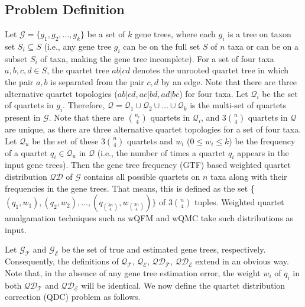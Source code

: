 \documentclass[10pt,a4paper]{article}
\begin{document}
\subsection{Problem Definition}
Let $\mathcal{G} =  \{g_1, g_2, \ldots, g_k\}$ be a set of $k$ gene trees, where each $g_i$ is a tree on taxon set $S_i \subseteq S$ (i.e., any gene tree $g_i$ can be on the full set $S$ of $n$ taxa or can be on a subset $S_i$ of taxa, making the gene tree incomplete). For a set of four taxa $a,b,c,d \in S$, the quartet tree $ab|cd$ denotes the unrooted quartet tree in which the pair $a, b$ is separated from the pair $c, d$ by an edge. Note that there are three alternative quartet topologies ($ab|cd, ac|bd, ad|bc$) for four taxa.
Let $\mathcal{Q}_i$ be the set of quartets in $g_i$. Therefore, $\mathcal{Q} = \mathcal{Q}_1 \cup \mathcal{Q}_2 \cup \ldots \cup \mathcal{Q}_k$ is the multi-set of quartets present in $\mathcal{G}$. Note that there are $n_i \choose 4$ quartets in $\mathcal{Q}_i$, and $3$$n \choose 4$ quartets in $\mathcal{Q}$ are unique, as there are three alternative quartet topologies for a set of four taxa. Let $\mathcal{Q}_u$ be the set of these $3$$n \choose 4$ quartets and $w_i$ ($0 \le w_i \le k$) be the frequency of a quartet $q_i \in \mathcal{Q}_u$ in $\mathcal{Q}$ (i.e., the number of times  a quartet $q_i$ appears in the input gene trees). Then the gene tree frequency (GTF) based weighted quartet distribution $\mathcal{QD}$ of $\mathcal{G}$ contains all possible quartets on $n$ taxa along with their frequencies in the gene trees. That means, this is defined as the set \{$(q_1,w_1), (q_2,w_2), \ldots, (q_{3n \choose 4},w_{3n \choose 4})\}$ of $3$$n \choose 4$ tuples. Weighted quartet amalgamation techniques such as wQFM and wQMC take such distributions as input.

Let $\mathcal{G_T}$ and $\mathcal{G_E}$ be the set of true and estimated gene trees, respectively. Consequently, the definitions of $\mathcal{Q_T}$, $\mathcal{Q_E}$, $\mathcal{QD_T}$, $\mathcal{QD_E}$ extend in an obvious way. Note that, in the absence of any gene tree estimation error, the weight $w_i$ of $q_i$ in both $\mathcal{QD_T}$ and $\mathcal{QD_E}$ will be identical. We now define the quartet distribution correction (QDC) problem as follows.
\end{document}
